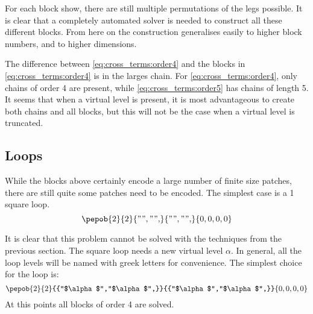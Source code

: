 For each block show, there are still multiple permutations of the legs possible. It is clear that a completely automated solver is needed to construct all these different blocks. From here on the construction generalises easily to higher block numbers, and to higher dimensions.

The difference between \cref{eq:cross_terms:order4} and the blocks in \cref{eq:cross_terms:order4} is in the larges chain. For \cref{eq:cross_terms:order4}, only chains of order 4 are present, while  \cref{eq:cross_terms:order5} has chains of length 5. It seems that when a virtual level is present, it is most advantageous to create both chains and all blocks, but this will not be the case when a virtual level is truncated.

\subsection{Loops}

While the blocks above certainly encode a large number of finite size patches, there are still quite some patches need to be encoded. The simplest case is a 1 square loop.
\begin{equation}
    {\pepob{2}{2}{{"","",}}{{"","",}}{{0,0,0,0}}}
\end{equation}

It is clear that this problem cannot be solved with the techniques from the previous section. The square loop needs a new virtual level $\alpha$. In general, all the loop levels will be named with greek letters for convenience. The simplest choice for the loop is:
\begin{equation}\label{tikzfig:plaquetter}
    {\pepob{2}{2}{{"$\alpha$","$\alpha$",}}{{"$\alpha$","$\alpha$",}}{{0,0,0,0}}}
\end{equation}
At this points all blocks of order 4 are solved.

